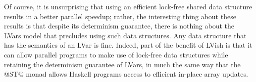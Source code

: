 Of course, it is unsurprising that using an efficient lock-free shared
data structure results in a better parallel speedup; rather, the
interesting thing about these results is that despite its determinism
guarantee, there is nothing about the LVars model that precludes using
such data structures.  Any data structure that has the semantics of an
LVar is fine.  Indeed, part of the benefit of LVish is that it can
allow parallel programs to make use of lock-free data structures while
retaining the determinism guarantee of LVars, in much the same way
that the @ST@ monad allows Haskell programs access to efficient
in-place array updates.
